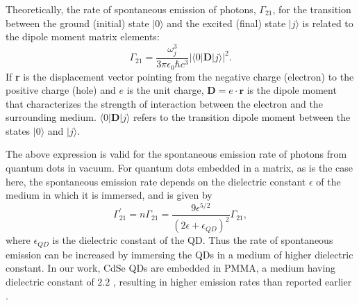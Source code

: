 \documentclass[%
 aip,
 amsmath,amssymb,
 reprint,%
]{revtex4-1}
\begin{document}
Theoretically, the rate of spontaneous emission  of photons, $\Gamma_{21}$,  for the transition between the ground (initial) state $|0 \rangle$ and the excited (final) state $|j \rangle$ is related to the dipole moment matrix elements\cite{AAC}:
\begin{equation}
\Gamma_{21} = {\frac{ \omega_j ^3}{{3 \pi \epsilon_0 \hbar c^3}}| \langle 0| \textbf{D}|j \rangle| ^2}. 
\label{eq:spontan vaccum}
\end{equation}
If  \textbf{r} is the displacement vector pointing from the negative charge (electron) to the positive charge (hole) and $e$ is the unit charge, $\textbf{D} = e \cdot \textbf{r}$ is the dipole moment that characterizes the strength of interaction between the electron and the surrounding medium.  $ \langle 0| \textbf{D}|j \rangle$ refers to the transition dipole moment between the states $| 0 \rangle$ and $|j \rangle$. 

The above expression is valid for the spontaneous emission rate of photons from quantum dots in vacuum. For quantum dots embedded in a matrix, as is the case here, \cite{AAP} the spontaneous emission rate depends on the dielectric constant $\epsilon$ of the medium in which it is immersed, and is given by \cite{YY}
\begin{equation}
\Gamma_{21}^{\prime} = n \Gamma_{21} = \frac{9 \epsilon^{5/2}}{(2 \epsilon + \epsilon_{QD})^2} \Gamma_{21},
\label{eq:spontan rate}
\end{equation}
\noindent where $\epsilon_{QD}$ is the dielectric constant of the QD. Thus the rate of  spontaneous emission can be increased by immersing the QDs in a medium of higher dielectric constant. In our work, CdSe QDs are embedded in PMMA, a medium having dielectric constant of $2.2$ \cite{AAN}, resulting in higher emission rates than reported earlier \cite{AAR, AAS}. 
\end{document}
